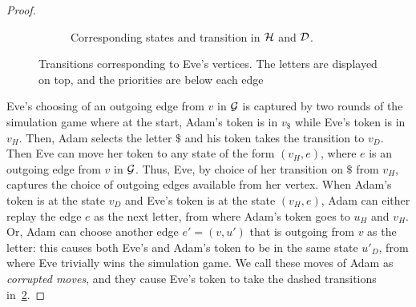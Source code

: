 \begin{proof}
\begin{figure}
\begin{subfigure}[t]{0.57\linewidth}
\caption{Corresponding states and transition in $\mathcal{H}$ and $\mathcal{D}$.}\label{fig:Eve-vertexb}
\end{subfigure}    
\caption{Transitions corresponding to Eve's vertices. The letters are displayed on top, and the priorities are below each edge}\label{fig:Eve-vertex}
\end{figure}

    
    Eve's choosing of an outgoing edge from $v$ in $\mathcal{G}$ is captured by two rounds of the simulation game where at the start, Adam's token is in $v_{\$}$ while Eve's token is in $v_H$. Then, Adam selects the letter $\$$ and his token takes the transition to $v_D$. Then Eve can move her token to any state of the form $(v_H,e)$, where $e$ is an outgoing edge from $v$ in $\mathcal{G}$. Thus, Eve, by choice of her transition on $\$$ from $v_H$, captures the choice of outgoing edges available from her vertex. When Adam's token is at the state $v_D$ and Eve's token is at the state $(v_H,e)$, Adam can either replay the edge $e$ as the next letter, from where Adam's token goes to $u_H$ and $v_H$. Or, Adam can choose another edge $e'=(v,u')$ that is outgoing from $v$ as the letter: this causes both Eve's and Adam's token to be in the same state $u'_D$, from where Eve trivially wins the simulation game. We call these moves of Adam as \emph{corrupted moves}, and they cause Eve's token to take the dashed transitions in~\cref{fig:Eve-vertex}. 


\end{proof}
